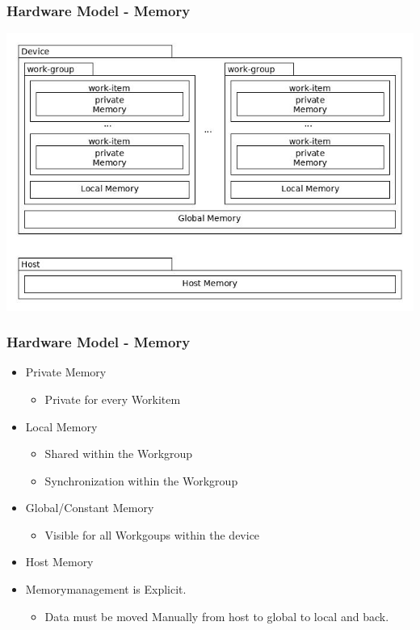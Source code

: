 \documentclass{beamer}
\begin{document}
\begin{frame}
    \frametitle{Hardware Model - Memory}
        \includegraphics[width=.8\textwidth]{res/OpenCLMemoryStructure.jpg}
        
\end{frame}
\begin{frame}
    \frametitle{Hardware Model - Memory}
        \begin{itemize}
            \item Private Memory
            \begin{itemize}
             \item Private for every Workitem
            \end{itemize}
            \item Local Memory
            \begin{itemize}
             \item Shared within the Workgroup
             \item Synchronization within the Workgroup
            \end{itemize}
            \item Global/Constant Memory
            \begin{itemize}
             \item Visible for all Workgoups within the device
            \end{itemize}
            \item Host Memory
            \item Memorymanagement is Explicit.
            \begin{itemize}
             \item Data must be moved Manually from host to global to local and back.
            \end{itemize}

        \end{itemize}
\end{frame}
\end{document}
